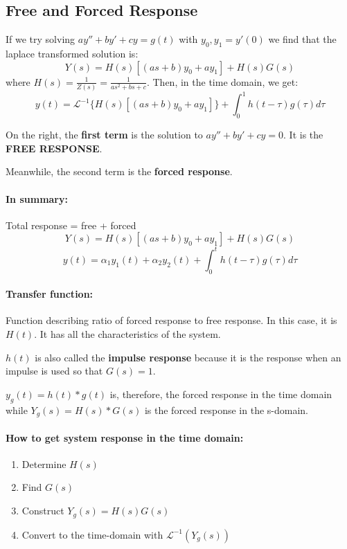 \documentclass[a4paper,12pt]{report}
\begin{document}
\subsection{Free and Forced Response}
If we try solving $ay'' + by' + cy = g(t)$ with $y_0, y_1=y'(0)$ we find that the laplace transformed solution is: 
$$
Y(s) = H(s)[(as+b)y_0 + ay_1]+H(s)G(s)
$$
where $H(s) = \frac{1}{Z(s)} = \frac{1}{as^2 + bs + c}$. Then, in the time domain, we get: 
$$
y(t) = \mathcal{L}^{-1}\{H(s)[(as+b)y_0 + ay_1]\} + \int_0^1 h(t-\tau)g(\tau)d\tau
$$

On the right, the \textbf{first term} is the solution to $ay'' + by' + cy = 0$. It is the \textbf{FREE RESPONSE}. 

Meanwhile, the second term is the \textbf{forced response}. 

\paragraph{In summary: } Total response = free + forced
$$Y(s) = H(s)[(as+b)y_0 + ay_1] + H(s)G(s)$$
$$y(t) = \alpha_1y_1(t) + \alpha_2y_2(t) + \int_0^t h(t-\tau)g(\tau)d\tau$$

\paragraph{Transfer function: } Function describing ratio of forced response to free response. In this case, it is $H(t)$. It has 
all the characteristics of the system. 

$h(t)$ is also called the \textbf{impulse response} because it is the response when an impulse is used so that $G(s) = 1$. 

$y_g(t) = h(t)*g(t)$ is, therefore, the forced response in the time domain while $Y_g(s) = H(s)*G(s)$ is the forced response in the s-domain. 

\paragraph{How to get system response in the time domain: } 
\begin{enumerate}
\item Determine $H(s)$
\item Find $G(s)$
\item Construct $Y_g(s) = H(s)G(s)$
\item Convert to the time-domain with $\mathcal{L}^{-1}(Y_g(s))$
\end{enumerate}
\end{document}

